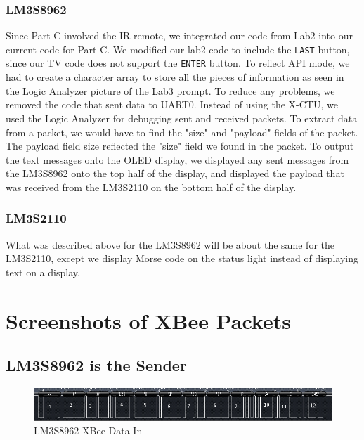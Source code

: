 \documentclass[11pt, titlepage]{article}
\begin{document}
            \subsubsection{LM3S8962}
                Since Part C involved the IR remote, we integrated our code from Lab2 into our current code for Part C. We modified our lab2 code to include the \texttt{LAST} button, since our TV code does not support the \texttt{ENTER} button. To reflect API mode, we had to create a character array to store all the pieces of information as seen in the Logic Analyzer picture of the Lab3 prompt. To reduce any problems, we removed the code that sent data to UART0. Instead of using the X-CTU, we used the Logic Analyzer for debugging sent and received packets. To extract data from a packet, we would have to find the "size" and "payload" fields of the packet. The payload field size reflected the "size" field we found in the packet. To output the text messages onto the OLED display, we displayed any sent messages from the LM3S8962 onto the top half of the display, and displayed the payload that was received from the LM3S2110 on the bottom half of the display.
            
            \subsubsection{LM3S2110}
                What was described above for the LM3S8962 will be about the same for the LM3S2110, except we display Morse code on the status light instead of displaying text on a display.
    
    \section{Screenshots of XBee Packets}
        \subsection{LM3S8962 is the Sender}
            \FloatBarrier
            \begin{figure}[htbp]
                \centering
                \includegraphics[scale = 0.8]{Screenshots/8962_in.png}
                \caption{LM3S8962 XBee Data In}
            \end{figure}
            \FloatBarrier
            
\end{document}

